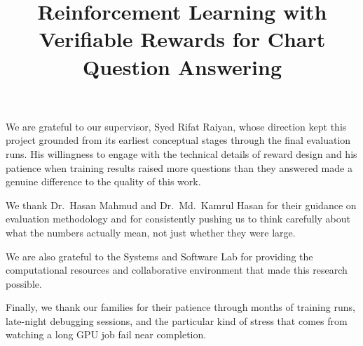 \documentclass{iutbscthesis}
\title{Reinforcement Learning with Verifiable Rewards for Chart Question Answering}
\begin{document}

\coverpage
{}
\titlepage
\declarationofcandidate


\tableofcontents
\listoffigures
\listoftables

\clearpage

\begin{abbreviations}
\end{abbreviations}

\begin{acknowledgement}
We are grateful to our supervisor, Syed Rifat Raiyan, whose direction kept this project grounded from its earliest conceptual stages through the final evaluation runs. His willingness to engage with the technical details of reward design and his patience when training results raised more questions than they answered made a genuine difference to the quality of this work.

We thank Dr.\ Hasan Mahmud and Dr.\ Md.\ Kamrul Hasan for their guidance on evaluation methodology and for consistently pushing us to think carefully about what the numbers actually mean, not just whether they were large.

We are also grateful to the Systems and Software Lab for providing the computational resources and collaborative environment that made this research possible.

Finally, we thank our families for their patience through months of training runs, late-night debugging sessions, and the particular kind of stress that comes from watching a long GPU job fail near completion.
\end{acknowledgement}
\end{document}
